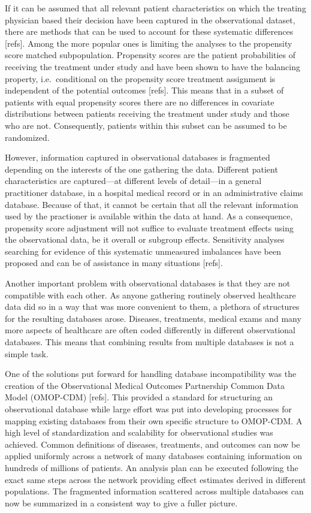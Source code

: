\documentclass[
]{book}
\begin{document}
If it can be assumed that all relevant patient characteristics on which the
treating physician based their decision have been captured in the observational
dataset, there are methods that can be used to account for these systematic
differences {[}refs{]}. Among the more popular ones is limiting the analyses
to the propensity score matched subpopulation. Propensity scores are the patient
probabilities of receiving the treatment under study and have been shown to have
the balancing property, i.e.~conditional on the propensity score treatment
assignment is independent of the potential outcomes {[}refs{]}. This means that in a
subset of patients with equal propensity scores there are no differences in
covariate distributions between patients receiving the treatment under study
and those who are not. Consequently, patients within this subset can be assumed
to be randomized.

However, information captured in observational databases is fragmented depending
on the interests of the one gathering the data. Different patient
characteristics are captured---at different levels of detail---in a general
practitioner database, in a hospital medical record or in an administrative
claims database. Because of that, it cannot be certain that all the relevant
information used by the practioner is available within the data at hand. As
a consequence, propensity score adjustment will not suffice to evaluate
treatment effects using the observational data, be it overall or subgroup
effects. Sensitivity analyses searching for evidence of this systematic
unmeasured imbalances have been proposed and can be of assistance in many
situations {[}refs{]}.

Another important problem with observational databases is that they are not
compatible with each other. As anyone gathering routinely observed healthcare
data did so in a way that was more convenient to them, a plethora of structures
for the resulting databases arose. Diseases, treatments, medical exams and many
more aspects of healthcare are often coded differently in different
observational databases. This means that combining results from multiple
databases is not a simple task.

One of the solutions put forward for handling database incompatibility was the
creation of the Observational Medical Outcomes Partnership Common Data Model
(OMOP-CDM) {[}refs{]}. This provided a standard for structuring an observational
database while large effort was put into developing processes for mapping
existing databases from their own specific structure to OMOP-CDM. A high level of
standardization and scalability for observational studies was achieved. Common
definitions of diseases, treatments, and outcomes can now be applied uniformly
across a network of many databases containing information on hundreds of
millions of patients. An analysis plan can be executed following the exact same
steps across the network providing effect estimates derived in different
populations. The fragmented information scattered across multiple databases can
now be summarized in a consistent way to give a fuller picture.
\end{document}
